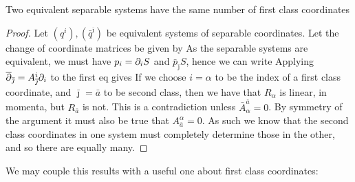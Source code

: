 \documentclass{article}
\begin{document}
\begin{prop}
Two equivalent separable systems have the same number of first class coordinates
\end{prop}
\begin{proof}
Let $(q^i), (\bar{q}^{\bar{\imath}})$ be equivalent systems of separable coordinates. Let the change of coordinate matrices be given by 
As the separable systems are equivalent, we must have $p_i  = \partial_i S$ and $\bar{p}_{\bar{\jmath}} S$, hence we can write
Applying $\overline{\partial}_{\overline{\jmath}} = A^i_{\overline{\jmath}} \partial_i$ to the first eq gives
If we choose $i=\alpha$ to be the index of a first class coordinate, and $\bar{\jmath} = \bar{a}$ to be second class, then we have that $R_\alpha$ is linear, in momenta, but $R_{\bar{a}}$ is not. This is a contradiction unless $\bar{A}^{\bar{a}}_\alpha = 0$. By symmetry of the argument it must also be true that $A^\alpha_{\bar{a}}=0$. As such we know that the second class coordinates in one system must completely determine those in the other, and so there are equally many.
\end{proof}

We may couple this results with a useful one about first class coordinates: 
\end{document}
